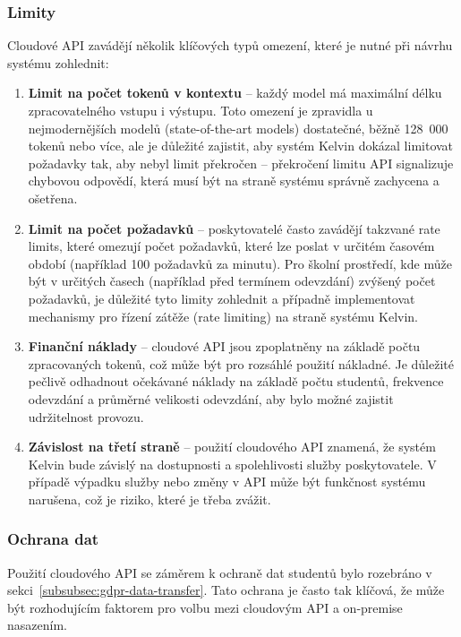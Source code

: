 \subsubsection*{Limity}

Cloudové API zavádějí několik klíčových typů omezení, které je nutné při návrhu systému zohlednit:

\begin{enumerate}
    \item \textbf{Limit na počet tokenů v kontextu} -- každý model má maximální délku zpracovatelného vstupu i výstupu.
    Toto omezení je zpravidla u nejmodernějších modelů (state-of-the-art models) dostatečné, běžně 128~000 tokenů nebo více, ale je důležité zajistit, aby systém Kelvin dokázal limitovat požadavky tak, aby nebyl limit překročen -- překročení limitu API signalizuje chybovou odpovědí, která musí být na straně systému správně zachycena a ošetřena.

    \item \textbf{Limit na počet požadavků} -- poskytovatelé často zavádějí takzvané rate limits, které omezují počet požadavků, které lze poslat v určitém časovém období (například 100 požadavků za minutu).
    Pro školní prostředí, kde může být v určitých časech (například před termínem odevzdání) zvýšený počet požadavků, je důležité tyto limity zohlednit a případně implementovat mechanismy pro řízení zátěže (rate limiting) na straně systému Kelvin\@.

    \item \textbf{Finanční náklady} -- cloudové API jsou zpoplatněny na základě počtu zpracovaných tokenů, což může být pro rozsáhlé použití nákladné.
    Je důležité pečlivě odhadnout očekávané náklady na základě počtu studentů, frekvence odevzdání a průměrné velikosti odevzdání, aby bylo možné zajistit udržitelnost provozu.

    \item \textbf{Závislost na třetí straně} -- použití cloudového API znamená, že systém Kelvin bude závislý na dostupnosti a spolehlivosti služby poskytovatele.
    V případě výpadku služby nebo změny v API může být funkčnost systému narušena, což je riziko, které je třeba zvážit.
\end{enumerate}

\subsubsection*{Ochrana dat}

Použití cloudového API se záměrem k ochraně dat studentů bylo rozebráno v sekci~\ref{subsubsec:gdpr-data-transfer}.
Tato ochrana je často tak klíčová, že může být rozhodujícím faktorem pro volbu mezi cloudovým API a on-premise nasazením.

